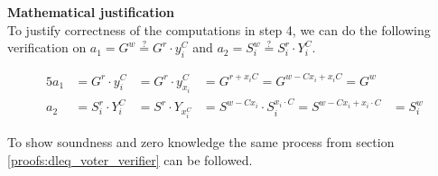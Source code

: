  \noindent
\textbf{Mathematical justification}\\
To justify correctness of the computations in step 4, we can do the following verification on \begin{math}a_1=G^w \stackrel{?}{=} G^r \cdot y_i^C\end{math} and \begin{math}a_2=S_i^w \stackrel{?}{=} S_i^r \cdot Y_i^C\end{math}.


\begin{alignat*}{5}
a_1 &=G^r \cdot y_i^C &=G^r \cdot y_{x_i}^C &=G^{r+x_iC} =G^{w-Cx_i+x_iC} =G^w\\
a_2 &= S_i^r \cdot Y_i^C &=S^r \cdot Y_{x_i^C} &=S^{w-Cx_i} \cdot S_i^{x_i \cdot C} =S^{w-Cx_i+x_i \cdot C}&=S_i^w
\end{alignat*}




\noindent
To show soundness and zero knowledge the same process from section \ref{proofs:dleq_voter_verifier} can be followed.